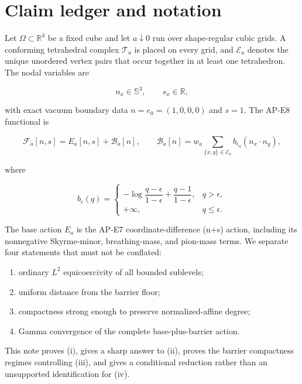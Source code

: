\documentclass[11pt]{article}
\numberwithin{equation}{section}
\theoremstyle{definition}
\theoremstyle{remark}
\newcommand{\RR}{\mathbb R}
\newcommand{\SSS}{\mathbb S}
\newcommand{\cB}{\mathcal B}
\newcommand{\cE}{\mathcal E}
\newcommand{\cT}{\mathcal T}
\newcommand{\cF}{\mathcal F}
\newcommand{\ezer}{e_0}
\begin{document}
\section{Claim ledger and notation}

Let $\Omega\subset\RR^3$ be a fixed cube and let $a\downarrow0$ run over
shape-regular cubic grids.  A conforming tetrahedral complex $\cT_a$ is
placed on every grid, and $\cE_a$ denotes the unique unordered vertex pairs
that occur together in at least one tetrahedron.  The nodal variables are

\[
 n_x\in\SSS^3,\qquad s_x\in\RR,
\]

with exact vacuum boundary data $n=\ezer=(1,0,0,0)$ and $s=1$.  The AP-E8
functional is

\begin{equation}
 \cF_a[n,s]
 =E_a[n,s]+\cB_a[n],\qquad
 \cB_a[n]=w_a\sum_{\{x,y\}\in\cE_a}
 b_{\epsilon_a}(n_x\cdot n_y),
 \label{eq:functional}
\end{equation}

where

\begin{equation}
 b_\epsilon(q)=
 \begin{cases}
 -\log\dfrac{q-\epsilon}{1-\epsilon}
 +\dfrac{q-1}{1-\epsilon},&q>\epsilon,\\[5pt]
 +\infty,&q\le\epsilon.
 \end{cases}
 \label{eq:barrier}
\end{equation}

The base action $E_a$ is the AP-E7 coordinate-difference (n+s) action,
including its nonnegative Skyrme-minor, breathing-mass, and pion-mass terms.
We separate four statements that must not be conflated:

\begin{enumerate}[label=(\roman*)]
\item ordinary $L^2$ equicoercivity of all bounded sublevels;
\item uniform distance from the barrier floor;
\item compactness strong enough to preserve normalized-affine degree;
\item Gamma convergence of the complete base-plus-barrier action.
\end{enumerate}

This note proves (i), gives a sharp answer to (ii), proves the barrier
compactness regimes controlling (iii), and gives a conditional reduction
rather than an unsupported identification for (iv).
\end{document}

